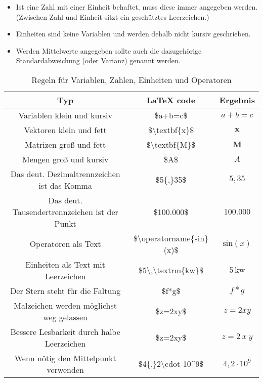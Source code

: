 \begin{itemize}
  \item Ist eine Zahl mit einer Einheit behaftet, muss diese immer angegeben werden. (Zwischen Zahl und Einheit sitzt ein geschütztes Leerzeichen.) %
  \item Einheiten sind keine Variablen und werden dehalb nicht kursiv geschrieben.
  \item Werden Mittelwerte angegeben sollte auch die dazugehörige Standardabweichung (oder Varianz) genannt werden.
\end{itemize}

\begin{table}[htbp]
  \caption{Regeln für Variablen, Zahlen, Einheiten und Operatoren}
  \renewcommand{\arraystretch}{1.3}
  \centering
  \begin{tabular}{c c c }
    \toprule
    Typ & LaTeX code & Ergebnis \\
    \midrule
    Variablen klein und kursiv & \$a+b=c\$ & $a+b=c$ \\
    Vektoren klein und fett & \$\textbackslash textbf\{x\}\$ & $\textbf{x}$ \\
    Matrizen groß und fett & \$\textbackslash textbf\{M\}\$ & $\textbf{M}$ \\
    Mengen groß und kursiv & \$A\$ & $A$ \\
    Das deut. Dezimaltrennzeichen ist das Komma & \$5\{,\}35\$ & $5{,}35$ \\
    Das deut. Tausendertrennzeichen ist der Punkt & \$100.000\$ & $100.000$ \\
    Operatoren als Text & \$\textbackslash operatorname\{sin\}(x)\$ & $\textrm{sin}(x)$ \\
    Einheiten als Text mit Leerzeichen & \$5\textbackslash,\textbackslash textrm\{kw\}\$ & $5\,\textrm{kw}$ \\
    Der Stern steht für die Faltung & \$f*g\$ & $f*g$ \\
    Malzeichen werden möglichst weg gelassen & \$z=2xy\$ & $z=2xy$ \\
		Bessere Lesbarkeit durch halbe Leerzeichen & \$z=2\:x\:y\$ & $z=2\:x\:y$ \\
    Wenn nötig den Mittelpunkt verwenden & \$4\{,\}2\textbackslash cdot 10\textasciicircum 9\$ & $4{,}2\cdot 10^9$ \\
    \bottomrule
    \end{tabular}
  \label{tab:regeln}
\end{table}

